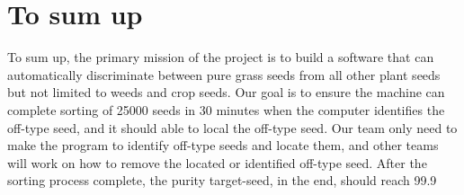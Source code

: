 \documentclass{article}
\begin{document}
\section{To sum up}
To sum up, the primary mission of the project is to build a software that can automatically discriminate between pure grass seeds from all other plant seeds but not limited to weeds and crop seeds. 
Our goal is to ensure the machine can complete sorting of 25000 seeds in 30 minutes when the computer identifies the off-type seed, and it should able to local the off-type seed.  Our team only need to make the program to identify off-type seeds and locate them, and other teams will work on how to remove the located or identified off-type seed.  After the sorting process complete, the purity target-seed, in the end, should reach 99.9%
\end{document}

